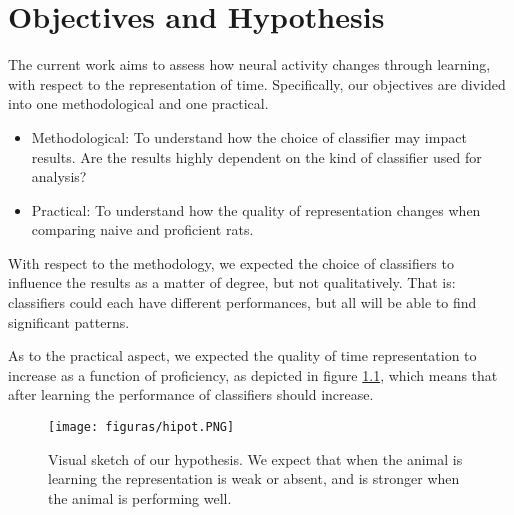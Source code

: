 \chapter{Objectives and Hypothesis}
\label{chap:hypothesis}

The current work aims to assess how neural activity changes through learning, with respect to the representation of time. Specifically, our objectives are divided into one methodological and one practical.
\begin{itemize}
    \item Methodological: To understand how the choice of classifier may impact results. Are the results highly dependent on the kind of classifier used for analysis?
    \item Practical: To understand how the quality of representation changes when comparing naive and proficient rats.
\end{itemize}

With respect to the methodology, we expected the choice of classifiers to influence the results as a matter of degree, but not qualitatively. That is: classifiers could each have different performances, but all will be able to find significant patterns.

As to the practical aspect, we expected the quality of time representation to increase as a function of proficiency, as depicted in figure \ref{fig:hip}, which means that after learning the performance of classifiers should increase. 

\begin{figure}
    \centering
    \texttt{[image: figuras/hipot.PNG]}
    \caption[Visual sketch of our hypothesis.]{Visual sketch of our hypothesis. We expect that when the animal is learning the representation is weak or absent, and is stronger when the animal is performing well.}
    \label{fig:hip}
\end{figure}
